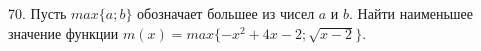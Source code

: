 70. Пусть $max\{a;b\}$ обозначает большее из чисел $a$ и $b.$ Найти наименьшее значение функции $m(x)=max\{-x^2+4x-2; \sqrt{x-2}\}.$\\
